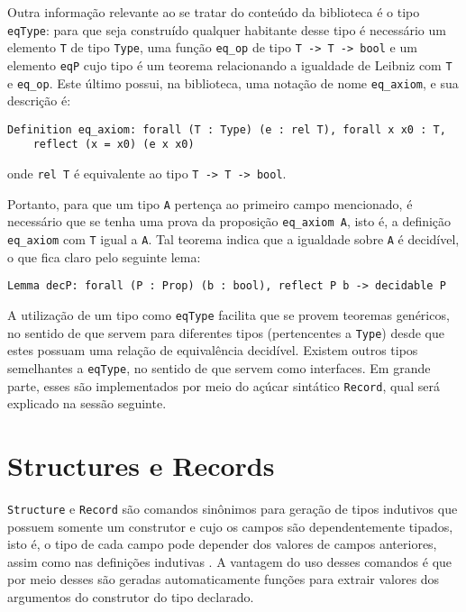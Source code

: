 Outra informação relevante ao se tratar do conteúdo da biblioteca é o tipo \lstinline[language = coq]$eqType$: para que seja construído qualquer habitante desse tipo é necessário um elemento \lstinline[language = coq]$T$ de tipo 
\lstinline[language = coq]$Type$, uma função \lstinline[language = coq]$eq_op$ de tipo \lstinline[language = coq]$T -> T -> bool$
e um elemento \lstinline[language = coq]$eqP$ cujo tipo é um teorema relacionando a igualdade de Leibniz com \lstinline[language = coq]$T$ e \lstinline[language = coq]$eq_op$. Este último possui, na biblioteca, uma notação de nome \lstinline[language = coq]$eq_axiom$, e sua descrição é:
    \begin{lstlisting}[language=coq,frame=single,tabsize=1]
Definition eq_axiom: forall (T : Type) (e : rel T), forall x x0 : T, 
    reflect (x = x0) (e x x0)
    \end{lstlisting}
onde \lstinline[language = coq]$rel T$ é equivalente ao tipo \lstinline[language = coq]$T -> T -> bool$.

Portanto, para que um tipo \lstinline[language = coq]$A$
pertença ao primeiro campo mencionado, é necessário que se tenha uma prova da proposição \lstinline[language = coq]$eq_axiom A$, isto é, 
a definição \lstinline[language = coq]$eq_axiom$ com 
\lstinline[language = coq]$T$ igual a \lstinline[language = coq]$A$.
Tal teorema indica que a igualdade sobre \lstinline[language = coq]$A$
é decidível, o que fica claro pelo seguinte lema:
    \begin{lstlisting}[language=coq,frame=single,tabsize=1]
Lemma decP: forall (P : Prop) (b : bool), reflect P b -> decidable P
    \end{lstlisting}

A utilização de um tipo como \lstinline[language = coq]$eqType$ facilita que se provem teoremas genéricos, no sentido de que servem para diferentes tipos (pertencentes a \lstinline[language = coq]$Type$) desde que estes possuam uma relação de equivalência decidível. Existem outros tipos semelhantes a \lstinline[language = coq]$eqType$, no sentido de que servem como interfaces. Em grande parte, esses são implementados por meio do açúcar sintático \lstinline[language = coq]$Record$, qual será explicado na sessão seguinte.

\section{Structures e Records} 
\label{section:structs-e-records}

\lstinline[language = coq]$Structure$ e \lstinline[language = coq]$Record$ são comandos sinônimos para geração de tipos indutivos que possuem somente um construtor e cujo os campos são dependentemente tipados, isto é, o tipo de cada campo pode depender dos valores de campos anteriores, assim como nas definições indutivas \cite{assia_mahboubi_2022_7118596}. A vantagem do uso desses comandos é que por meio desses são geradas automaticamente funções para extrair valores dos argumentos do construtor do tipo declarado.

